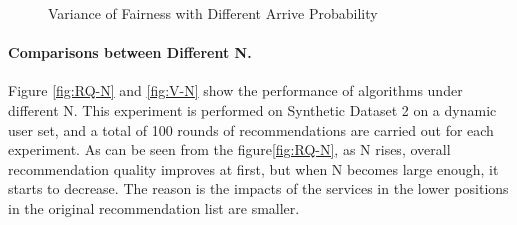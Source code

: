 \begin{figure}[h]
\centering
{}%
\quad
{}%
\quad
{}%
\quad
{}%
\centering
\caption{Variance of Fairness with Different Arrive Probability}
\label{fig:V-A}
\end{figure}

\paragraph{Comparisons between Different N.}  Figure \ref{fig:RQ-N} and \ref{fig:V-N} show the performance of algorithms under different N. This experiment is performed on Synthetic Dataset 2 on a dynamic user set, and a total of 100 rounds of recommendations are carried out for each experiment. As can be seen from the figure\ref{fig:RQ-N}, as N rises, overall recommendation quality improves at first, but when N becomes large enough, it starts to decrease. The reason is the impacts of the services in
the lower positions in the original recommendation list are smaller.


